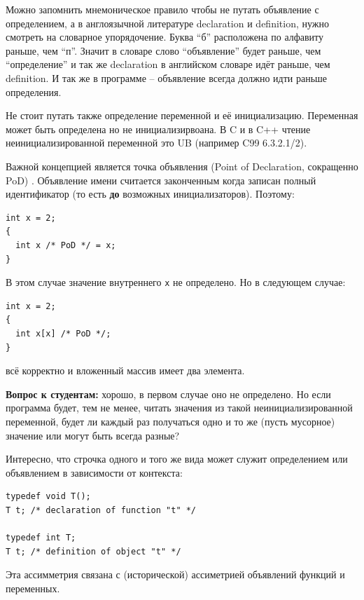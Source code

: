 \documentclass[a4paper,12pt,oneside]{article}
\newif\ifanswers
\begin{document}
Можно запомнить мнемоническое правило чтобы не путать объявление с определением, а в англоязычной литературе declaration и definition, нужно смотреть на словарное упорядочение.  Буква ``б'' расположена по алфавиту раньше, чем ``п''. Значит в словаре слово ``объявление'' будет раньше, чем ``определение'' и так же declaration в английском словаре идёт раньше, чем definition. И так же в программе – объявление всегда должно идти раньше определения.

Не стоит путать также определение переменной и её инициализацию. Переменная может быть определена но не инициализирвоана. В C и в C++ чтение неинициализированной переменной это UB (например C99 6.3.2.1/2).

Важной концепцией является точка объявления (Point of Declaration, сокращенно PoD) . Объявление имени считается законченным когда записан полный идентификатор (то есть \textbf{до} возможных инициализаторов). Поэтому:

\begin{lstlisting}
int x = 2;
{
  int x /* PoD */ = x;
}
\end{lstlisting}

В этом случае значение внутреннего \lstinline!x! не определено. Но в следующем случае:

\begin{lstlisting}
int x = 2;
{
  int x[x] /* PoD */;
}
\end{lstlisting}

всё корректно и вложенный массив имеет два элемента.

\textbf{Вопрос к студентам:} хорошо, в первом случае оно не определено. Но если программа будет, тем не менее, читать значения из такой неинициализированной переменной, будет ли каждый раз получаться одно и то же (пусть мусорное) значение или могут быть всегда разные?

\ifanswers
Ответ: могут быть всегда разные, так как UB
\fi

Интересно, что строчка одного и того же вида может служит определением или объявлением в зависимости от контекста:

\begin{lstlisting}
typedef void T();
T t; /* declaration of function "t" */

typedef int T;
T t; /* definition of object "t" */
\end{lstlisting}

Эта ассимметрия связана с (исторической) ассиметрией объявлений функций и переменных.
\end{document}
